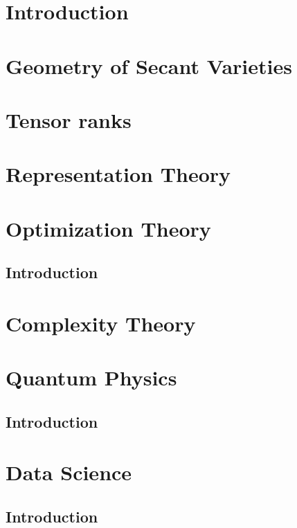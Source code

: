 \documentclass[oneside]{book}
\theoremstyle{plain}
\theoremstyle{definition}
\numberwithin{equation}{subsection}
\begin{document}
\part{Introduction}
\label{part-introduction}


\part{Geometry of Secant Varieties}
\label{part-geometrySecants}


\part{Tensor ranks}
\label{part-tensorRank}


\part{Representation Theory}
\label{part-RepTheory}


\part{Optimization Theory}
\label{part-optimization}

\chapter{Introduction}
\label{optimization-chapter-intro}

\part{Complexity Theory}
\label{part-complexityTheory}


\part{Quantum Physics}
\label{part-quantumph}

\chapter{Introduction}
\label{quantumph-chapter-intro}

\part{Data Science}
\label{part-datascience}

\chapter{Introduction}
\label{datascience-chapter-intro}



\end{document}
